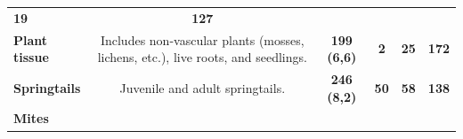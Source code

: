 \documentclass[11pt]{article}
\begin{document}
\begin{longtable}[]{@{}lccccc@{}}
\begin{minipage}[t]{0.04\columnwidth}
\textbf{19}\strut
\end{minipage} & \begin{minipage}[t]{0.04\columnwidth}\centering
\textbf{127}\strut
\end{minipage}\tabularnewline
\begin{minipage}[t]{0.11\columnwidth}\raggedright
\textbf{Plant tissue}\strut
\end{minipage} & \begin{minipage}[t]{0.45\columnwidth}\centering
Includes non-vascular plants (mosses, lichens, etc.), live roots, and
seedlings.\strut
\end{minipage} & \begin{minipage}[t]{0.14\columnwidth}\centering
\textbf{199 (6,6)}\strut
\end{minipage} & \begin{minipage}[t]{0.04\columnwidth}\centering
\textbf{2}\strut
\end{minipage} & \begin{minipage}[t]{0.04\columnwidth}\centering
\textbf{25}\strut
\end{minipage} & \begin{minipage}[t]{0.04\columnwidth}\centering
\textbf{172}\strut
\end{minipage}\tabularnewline
\begin{minipage}[t]{0.11\columnwidth}\raggedright
\textbf{Springtails}\strut
\end{minipage} & \begin{minipage}[t]{0.45\columnwidth}\centering
Juvenile and adult springtails.\strut
\end{minipage} & \begin{minipage}[t]{0.14\columnwidth}\centering
\textbf{246 (8,2)}\strut
\end{minipage} & \begin{minipage}[t]{0.04\columnwidth}\centering
\textbf{50}\strut
\end{minipage} & \begin{minipage}[t]{0.04\columnwidth}\centering
\textbf{58}\strut
\end{minipage} & \begin{minipage}[t]{0.04\columnwidth}\centering
\textbf{138}\strut
\end{minipage}\tabularnewline
\begin{minipage}[t]{0.11\columnwidth}\raggedright
\textbf{Mites}\strut
\end{minipage} & \begin{minipage}[t]{0.45\columnwidth}\centering

\end{minipage}
\end{longtable}
\end{document}
